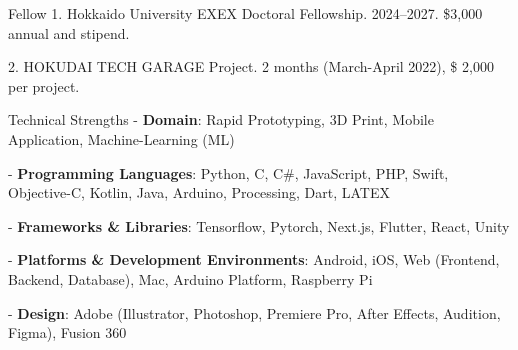 \documentclass[
	11pt, %
]{resume} %
\begin{document}
\begin{rSection}{Fellow}
    1. Hokkaido University EXEX Doctoral Fellowship. 2024--2027. \$3,000 annual and stipend.
    
    2. HOKUDAI TECH GARAGE Project. 2 months (March-April 2022), \$ 2,000 per project.
\end{rSection}


\begin{rSection}{Technical Strengths}
    - \textbf{Domain}: Rapid Prototyping, 3D Print, Mobile Application, Machine-Learning (ML)

    - \textbf{Programming Languages}:
    Python, C, C\#, JavaScript, PHP, Swift, Objective-C, Kotlin, Java, Arduino, Processing, Dart, LATEX

    - \textbf{Frameworks \& Libraries}:
    Tensorflow, Pytorch, Next.js, Flutter, React, Unity
    
    - \textbf{Platforms \& Development Environments}:
    Android, iOS, Web (Frontend, Backend, Database), Mac, Arduino Platform, Raspberry Pi

    - \textbf{Design}:
    Adobe (Illustrator, Photoshop, Premiere Pro, After Effects, Audition, Figma), Fusion 360
\end{rSection}
\end{document}
